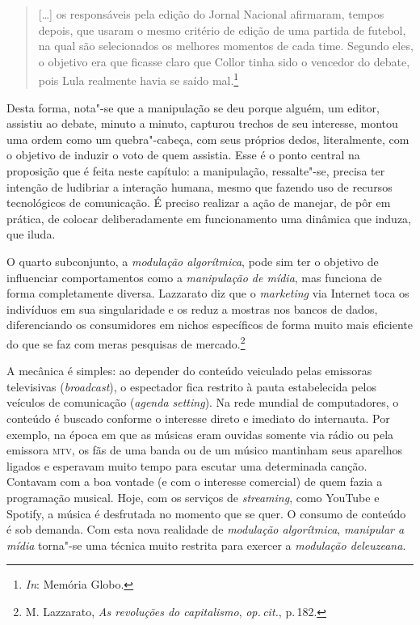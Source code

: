 \begin{quote}
{[}\ldots{}{]} os responsáveis pela edição do Jornal Nacional afirmaram, tempos
depois, que usaram o mesmo critério de edição de uma partida de futebol,
na qual são selecionados os melhores momentos de cada time. Segundo
eles, o objetivo era que ficasse claro que Collor tinha sido o vencedor
do debate, pois Lula realmente havia se saído mal.\footnote{\textit{In}: Memória Globo.}
\end{quote}

Desta forma, nota"-se que a manipulação se deu porque alguém, um editor,
assistiu ao debate, minuto a minuto, capturou trechos de seu interesse,
montou uma ordem como um quebra"-cabeça, com seus próprios dedos,
literalmente, com o objetivo de induzir o voto de quem assistia. Esse é
o ponto central na proposição que é feita neste capítulo: a manipulação, ressalte"-se, precisa ter intenção de ludibriar a interação humana,
mesmo que fazendo uso de recursos tecnológicos de comunicação. É preciso
realizar a ação de manejar, de pôr em prática, de colocar
deliberadamente em funcionamento uma dinâmica que induza, que iluda.

O quarto subconjunto, a \textit{modulação algorítmica}, pode sim ter o
objetivo de influenciar comportamentos como a \textit{manipulação de
mídia}, mas funciona de forma completamente diversa. Lazzarato diz que o
\textit{marketing} via Internet toca os indivíduos em sua singularidade e
os reduz a mostras nos bancos de dados, diferenciando os consumidores em
nichos específicos de forma muito mais eficiente do que se faz com meras
pesquisas de mercado.\footnote{M. Lazzarato, \textit{As revoluções do capitalismo}, \textit{op.\,cit.}, p.\,182.}

A mecânica é simples: ao depender do conteúdo veiculado pelas emissoras
televisivas (\textit{broadcast}), o espectador fica restrito à pauta
estabelecida pelos veículos de comunicação (\textit{agenda setting}). Na
rede mundial de computadores, o conteúdo é buscado conforme o interesse
direto e imediato do internauta. Por exemplo, na época em que as músicas
eram ouvidas somente via rádio ou pela emissora \textsc{mtv}, os fãs de uma banda
ou de um músico mantinham seus aparelhos ligados e esperavam muito tempo
para escutar uma determinada canção. Contavam com a boa vontade (e com o
interesse comercial) de quem fazia a programação musical. Hoje, com os
serviços de \textit{streaming}, como YouTube e Spotify, a música é
desfrutada no momento que se quer. O consumo de conteúdo é sob demanda.
Com esta nova realidade de \textit{modulação algorítmica}, \textit{manipular
a mídia} torna"-se uma técnica muito restrita para exercer a
\textit{modulação deleuzeana}.


